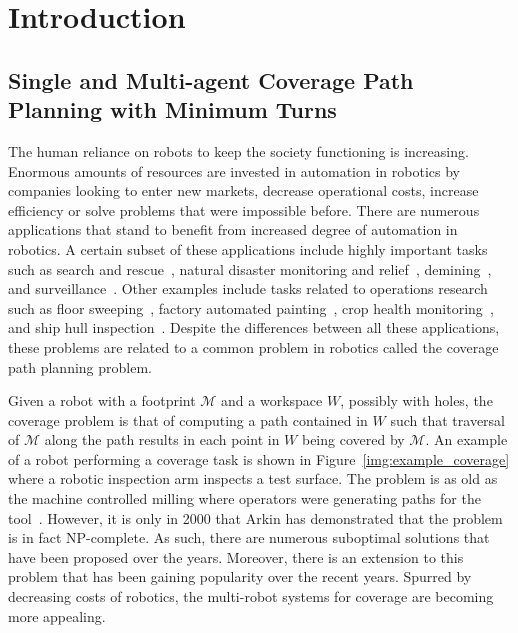 \documentclass[../main.tex]{subfiles}
\begin{document}
\chapter{Introduction}
\label{chapter:introduction}

\section{Single and Multi-agent Coverage Path Planning with Minimum Turns}
\label{section:coverage_path_planning_with_minimum_turns}

The human reliance on robots to keep the society functioning is increasing. Enormous amounts of resources are invested in automation in robotics by companies looking to enter new markets, decrease operational costs, increase efficiency or solve problems that were impossible before. There are numerous applications that stand to benefit from increased degree of automation in robotics. A certain subset of these applications include highly important tasks such as search and rescue~\cite{ryan2005mode}, natural disaster monitoring and relief~\cite{debusk2010unmanned}, demining~\cite{acar2003path}, and surveillance~\cite{quigley2005target}. Other examples include tasks related to operations research such as floor sweeping~\cite{hofner1994path}, factory automated painting~\cite{sheng2000automated}, crop health monitoring~\cite{rydberg2007field}, and ship hull inspection~\cite{walter2008slam}. Despite the differences between all these applications, these problems are related to a common problem in robotics called the coverage path planning problem.

Given a robot with a footprint $\mathcal{M}$ and a workspace $W$, possibly with holes, the coverage problem is that of computing a path contained in $W$ such that traversal of $\mathcal{M}$ along the path results in each point in $W$ being covered by $\mathcal{M}$. An example of a robot performing a coverage task is shown in Figure~\ref{img:example_coverage} where a robotic inspection arm inspects a test surface. The problem is as old as the machine controlled milling where operators were generating paths for the tool~\cite{held1991computational}. However, it is only in 2000 that Arkin\cite{arkin2000approximation} has demonstrated that the problem is in fact NP-complete. As such, there are numerous suboptimal solutions that have been proposed over the years. Moreover, there is an extension to this problem that has been gaining popularity over the recent years. Spurred by decreasing costs of robotics, the multi-robot systems for coverage are becoming more appealing.
\end{document}
